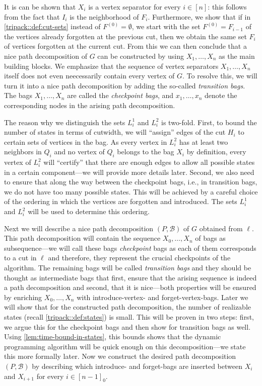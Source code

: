 \documentclass[a4paper,UKenglish,cleveref, autoref, thm-restate]{lipics-v2021}
\begin{document}
It is can be shown that $X_i$ is a vertex separator for every $i\in[n]$: this follows from the fact that $I_i$ is the neighborhood of $F_i$. 
Furthermore, we show that 
if in \cref{tripack::def:cut-sets} instead of $F^{(0)} = \emptyset$, we start with the set $F^{(0)} = F_{i-1}$ of the vertices already forgotten at the previous cut, then we obtain the same set $F_i$ of vertices forgotten at the current cut.
From this we can then conclude that a nice path decomposition of $G$ can be constructed by using $X_1, \dots, X_n$ as the main building blocks.
We emphasize that the sequence of vertex separators $X_1, \dots, X_n$ itself does not even neecessarily contain every vertex of $G$. 
To resolve this, we will turn it into a nice path decomposition by adding the so-called \emph{transition bags}.
The bags $X_1, \dots, X_n$ are called the \emph{checkpoint bags}, and $x_1, \dots, x_n$ denote the corresponding nodes in the arising path decomposition.

The reason why we distinguish the sets $L^1_i$ and $L^2_i$ is two-fold.
First, to bound the number of states in terms of cutwidth, we will ``assign'' edges of the cut $H_i$ to certain sets of vertices in the bag.
As every vertex in $L^2_i$ has at least two neighbors in $Q_i$ and no vertex of $Q_i$ belongs to the bag $X_i$ by definition, every vertex of $L^2_i$ will ``certify'' that there are enough edges to allow all possible states in a certain component---we will provide more details later. 
Second, we also need to ensure that along the way between the checkpoint bags, i.e., in transition bags, we do not have too many possible states.
This will be achieved by a careful choice of the ordering in which the vertices are forgotten and introduced.
The sets $L^1_i$ and $L^2_i$ will be used to determine this ordering.

Next we will describe a nice path decomposition $(P, \mathcal{B})$ of $G$ obtained from $\ell$.
This path decomposition will contain the sequence $X_0, \dots, X_n$ of bags as subsequence---we will call these bags \emph{checkpoint} bags as each of them corresponds to a cut in $\ell$ and therefore, they represent the crucial checkpoints of the algorithm.
The remaining bags will be called \emph{transition bags} and they should be thought as intermediate bags that first, ensure that the arising sequence is indeed a path decomposition and second, that it is nice---both properties will be ensured by enriching $X_0, \dots, X_n$ with introduce-vertex- and forget-vertex-bags.
Later we will show that for the constructed path decomposition, the number of realizable states (recall \cref{tripack::def:states}) is small.
This will be proven in two steps: first, we argue this for the checkpoint bags and then show for transition bags as well.
Using \cref{lem:time-bound-in-states}, this bounds shows that the dynamic programming algorithm will be quick enough on this decomposition---we state this more formally later.
Now we construct the desired path decomposition $(P, \mathcal{B})$ by describing which introduce- and forget-bags are inserted between $X_i$ and $X_{i+1}$ for every $i \in [n-1]_0$.
\end{document}
